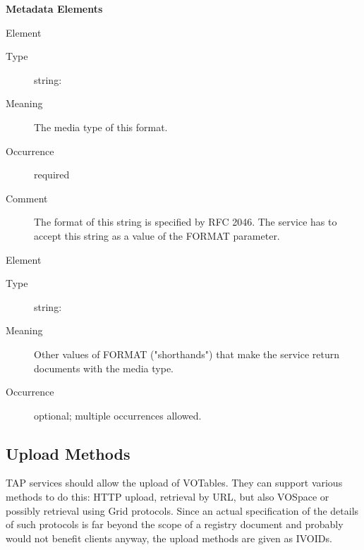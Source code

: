 \documentclass{ivoa}
\begin{document}
\begin{generated}
\begin{bigdescription}
\begin{description}
\end{description}


\end{bigdescription}\endgroup



\vspace{0.5ex}\noindent\textbf{ Metadata Elements}

\begingroup\small\begin{bigdescription}\item[Element \xmlel{mime}]
\begin{description}
\item[Type] string: 
\item[Meaning] 
          The media type of this format.
          
\item[Occurrence] required
\item[Comment] 
          The format of this string is specified by RFC 2046.
          The service has to accept this string as a 
          value of the FORMAT parameter.
          

\end{description}
\item[Element \xmlel{alias}]
\begin{description}
\item[Type] string: 
\item[Meaning] 
          Other values of FORMAT ({"}shorthands{"}) that make the service return 
          documents with the media type.
          
\item[Occurrence] optional; multiple occurrences allowed.

\end{description}


\end{bigdescription}\endgroup

\endgroup
\end{generated}


\subsection{Upload Methods}

\label{uploadmethods}

TAP services should allow the upload of VOTables.  They can support
various methods to do this: HTTP upload, retrieval by URL, but also VOSpace
or possibly retrieval using Grid protocols.  Since an actual specification
of the details of such protocols is far beyond the scope of a registry
document and probably would not benefit clients anyway, the upload
methods are given as IVOIDs.
\end{document}
